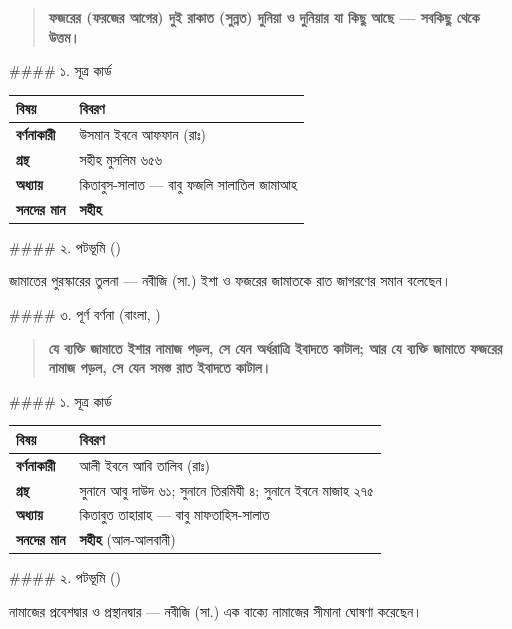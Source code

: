 \begin{quote}
\textbf{ফজরের (ফরজের আগের) দুই রাকাত (সুন্নত) দুনিয়া ও দুনিয়ার যা কিছু আছে — সবকিছু থেকে উত্তম।}
\end{quote}

\#\#\#\# ১. সূত্র কার্ড

\begin{table}[h]\centering\small
\begin{tabular}{ll}
বিষয় & বিবরণ \\
\hline
\textbf{বর্ণনাকারী} & উসমান ইবনে আফফান (রাঃ) \\
\textbf{গ্রন্থ} & সহীহ মুসলিম ৬৫৬ \\
\textbf{অধ্যায়} & কিতাবুস-সালাত — বাবু ফজলি সালাতিল জামাআহ \\
\textbf{সনদের মান} & \textbf{সহীহ} \\
\hline
\end{tabular}
\end{table}

\#\#\#\# ২. পটভূমি ()

জামাতের পুরস্কারের তুলনা — নবীজি (সা.) ইশা ও ফজরের জামাতকে রাত জাগরণের সমান বলেছেন।

\#\#\#\# ৩. পূর্ণ বর্ণনা (বাংলা, )

\begin{quote}
\textbf{যে ব্যক্তি জামাতে ইশার নামাজ পড়ল, সে যেন অর্ধরাত্রি ইবাদতে কাটাল; আর যে ব্যক্তি জামাতে ফজরের নামাজ পড়ল, সে যেন সমস্ত রাত ইবাদতে কাটাল।}
\end{quote}

\#\#\#\# ১. সূত্র কার্ড

\begin{table}[h]\centering\small
\begin{tabular}{ll}
বিষয় & বিবরণ \\
\hline
\textbf{বর্ণনাকারী} & আলী ইবনে আবি তালিব (রাঃ) \\
\textbf{গ্রন্থ} & সুনানে আবু দাউদ ৬১; সুনানে তিরমিযী ৪; সুনানে ইবনে মাজাহ ২৭৫ \\
\textbf{অধ্যায়} & কিতাবুত তাহারাহ — বাবু মাফতাহিস-সালাত \\
\textbf{সনদের মান} & \textbf{সহীহ} (আল-আলবানী) \\
\hline
\end{tabular}
\end{table}

\#\#\#\# ২. পটভূমি ()

নামাজের প্রবেশদ্বার ও প্রস্থানদ্বার — নবীজি (সা.) এক বাক্যে নামাজের সীমানা ঘোষণা করেছেন।


